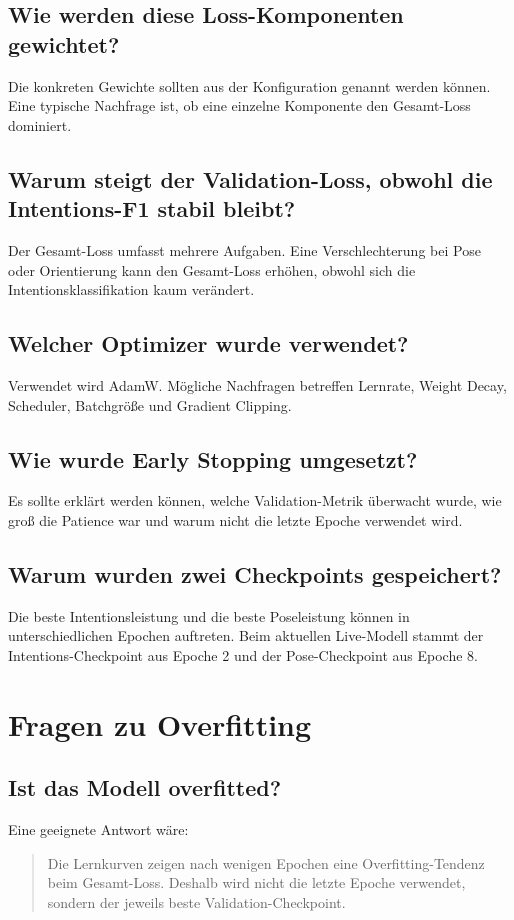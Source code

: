 \documentclass[11pt,a4paper]{article}
\begin{document}
\subsection*{Wie werden diese Loss-Komponenten gewichtet?}
Die konkreten Gewichte sollten aus der Konfiguration genannt werden können. Eine typische Nachfrage ist, ob eine einzelne Komponente den Gesamt-Loss dominiert.

\subsection*{Warum steigt der Validation-Loss, obwohl die Intentions-F1 stabil bleibt?}
Der Gesamt-Loss umfasst mehrere Aufgaben. Eine Verschlechterung bei Pose oder Orientierung kann den Gesamt-Loss erhöhen, obwohl sich die Intentionsklassifikation kaum verändert.

\subsection*{Welcher Optimizer wurde verwendet?}
Verwendet wird AdamW. Mögliche Nachfragen betreffen Lernrate, Weight Decay, Scheduler, Batchgröße und Gradient Clipping.

\subsection*{Wie wurde Early Stopping umgesetzt?}
Es sollte erklärt werden können, welche Validation-Metrik überwacht wurde, wie groß die Patience war und warum nicht die letzte Epoche verwendet wird.

\subsection*{Warum wurden zwei Checkpoints gespeichert?}
Die beste Intentionsleistung und die beste Poseleistung können in unterschiedlichen Epochen auftreten. Beim aktuellen Live-Modell stammt der Intentions-Checkpoint aus Epoche 2 und der Pose-Checkpoint aus Epoche 8.

\section{Fragen zu Overfitting}

\subsection*{Ist das Modell overfitted?}
Eine geeignete Antwort wäre:
\begin{quote}
Die Lernkurven zeigen nach wenigen Epochen eine Overfitting-Tendenz beim Gesamt-Loss. Deshalb wird nicht die letzte Epoche verwendet, sondern der jeweils beste Validation-Checkpoint.
\end{quote}
\end{document}
